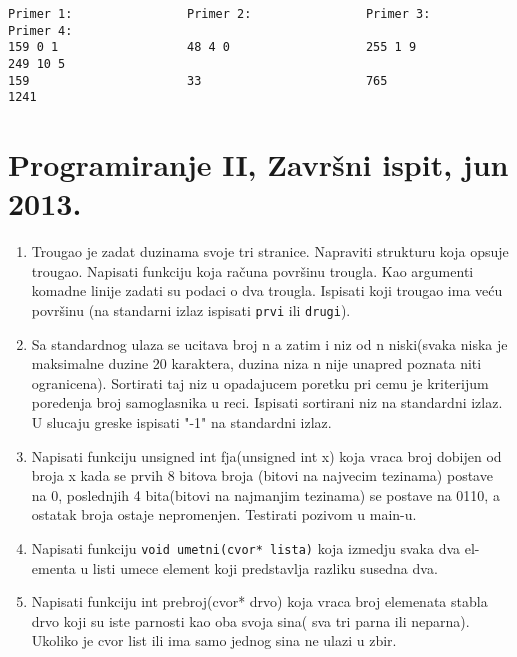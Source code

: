 \begin{verbatim}
Primer 1:                Primer 2:                Primer 3:                   Primer 4:
159 0 1                  48 4 0                   255 1 9                     249 10 5
159                      33                       765                         1241
\end{verbatim}


\section{Programiranje II, Zavr\v{s}ni ispit, jun 2013.}


\begin{enumerate}
\item Trougao je zadat duzinama svoje tri stranice. Napraviti strukturu koja opsuje trougao.
Napisati funkciju koja ra\v cuna povr\v sinu trougla.
Kao argumenti komadne linije zadati su podaci o dva trougla. Ispisati koji trougao ima ve\'cu povr\v sinu
(na standarni izlaz ispisati \verb|prvi| ili \verb|drugi|).

\item Sa standardnog ulaza se ucitava broj n a zatim i niz od n niski(svaka niska je maksimalne duzine 20 karaktera, duzina niza n
nije unapred poznata niti ogranicena).
Sortirati taj niz u opadajucem poretku pri cemu je kriterijum poredenja broj samoglasnika u reci.
Ispisati sortirani niz na standardni izlaz.
U slucaju greske ispisati "-1" na standardni izlaz.

\item Napisati funkciju unsigned int fja(unsigned int x) koja vraca broj dobijen od broja x kada se prvih 8 bitova broja
(bitovi na najvecim tezinama) postave na 0, poslednjih 4 bita(bitovi na najmanjim tezinama) se postave na 0110,
 a ostatak broja ostaje nepromenjen. Testirati pozivom u main-u.

\item Napisati funkciju \verb|void umetni(cvor* lista)| koja izmedju svaka dva el-
ementa u listi umece element koji predstavlja razliku susedna dva.

\item Napisati funkciju int prebroj(cvor* drvo) koja vraca broj elemenata stabla drvo koji su iste parnosti kao oba svoja sina(
sva tri parna ili neparna).
Ukoliko je cvor list ili ima samo jednog sina ne ulazi u zbir.

\end{enumerate}




